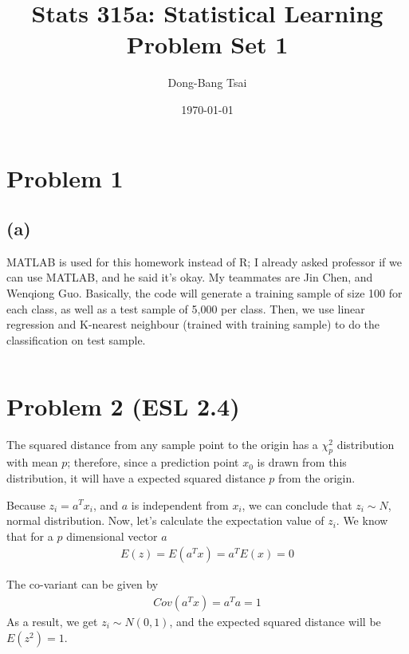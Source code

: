 \documentclass[pra,groupedaddress,amsmath,amssymb, column]{revtex4}
\begin{document}
\title{Stats 315a: Statistical Learning \\ Problem Set 1}
\author{Dong-Bang Tsai}



\date{\today}
\maketitle


\section*{Problem 1}
\subsection*{(a)}
MATLAB is used for this homework instead of R; I already asked professor if we can use MATLAB, and he said it's okay. My teammates are Jin Chen, and Wenqiong Guo. Basically, the code will generate a training sample of size 100 for each class, as well as a test sample of 5,000 per class. Then, we use linear regression and K-nearest neighbour (trained with training sample) to do the classification on test sample.
\begin{verbatim}
\end{verbatim}

\section*{Problem 2 (ESL 2.4)}
The squared distance from any sample point to the origin has a $\chi_p^2$ distribution with mean $p$; therefore, since a prediction point $x_0$ is drawn from this distribution, it will have a expected squared distance $p$ from the origin. 

Because $z_i=a^Tx_i$, and $a$ is independent from $x_i$, we can conclude that $z_i \sim N$, normal distribution. Now, let's calculate the expectation value of $z_i$. We know that for a $p$ dimensional vector $a$ 
\begin{align}
E(z) = E(a^Tx) = a^TE(x) = 0
\end{align}

The co-variant can be given by
\begin{align}
Cov(a^Tx) = a^Ta = 1
\end{align}
As a result, we get $z_i \sim N(0,1)$, and the expected squared distance will be $E(z^2) = 1$.
\end{document}
